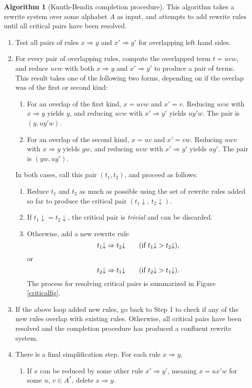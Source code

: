\documentclass[headsepline,bibliography=totoc]{scrreport}
\theoremstyle{definition}
\theoremstyle{definition}
\theoremstyle{definition}
\newtheorem{algorithm}{Algorithm}[chapter]
\begin{document}
\begin{algorithm}[Knuth-Bendix completion procedure]\label{knuthbendix} This algorithm takes a rewrite system over some alphabet $A$ as input, and attempts to add rewrite rules until all critical pairs have been resolved.
\begin{enumerate}
\item Test all pairs of rules $x\Rightarrow y$ and $x'\Rightarrow y'$ for overlapping left hand sides.
\item For every pair of overlapping rules, compute the overlapped term $t=uvw$, and reduce $uvw$ with both $x\Rightarrow y$ and $x'\Rightarrow y'$ to produce a pair of terms. This result takes one of the following two forms, depending on if the overlap was of the first or second kind:
\begin{enumerate}
\item For an overlap of the first kind, $x=uvw$ and $x'=v$. Reducing $uvw$ with $x\Rightarrow y$ yields $y$, and reducing $uvw$ with $x'\Rightarrow y'$ yields $uy'w$. The pair is $(y, uy'w)$.
\item For an overlap of the second kind, $x=uv$ and $x'=vw$. Reducing $uwv$ with $x\Rightarrow y$ yields $yw$, and reducing $uvw$ with $x'\Rightarrow y'$ yields $uy'$. The pair is $(yw, uy')$.
\end{enumerate}
In both cases, call this pair $(t_1, t_2)$, and proceed as follows:
\begin{enumerate}
\item Reduce $t_1$ and $t_2$ as much as possible using the set of rewrite rules added so far to produce the critical pair $({t}_1{\downarrow},\, {t}_2{\downarrow})$.
\item If ${t}_1{\downarrow}={t}_2{\downarrow}$, the critical pair is \emph{trivial} and can be discarded. \item Otherwise, add a new rewrite rule
\[{t}_1{\downarrow}\Rightarrow {t}_2{\downarrow}\qquad\hbox{(if ${t}_1{\downarrow}>{t}_2{\downarrow}$),}\]
or
\[{t}_2{\downarrow}\Rightarrow {t}_1{\downarrow}\qquad\hbox{(if ${t}_2{\downarrow}>{t}_1{\downarrow}$).}\]
The process for resolving critical pairs is summarized in Figure \ref{criticalfig}.
\end{enumerate}
\item If the above loop added new rules, go back to Step 1 to check if any of the new rules overlap with existing rules. Otherwise, all critical pairs have been resolved and the completion procedure has produced a confluent rewrite system.
\item There is a final simplification step. For each rule $x\Rightarrow y$,
\begin{enumerate}
\item If $x$ can be reduced by some other rule $x'\Rightarrow y'$, meaning $x=ux'w$ for some $u$, $v\in A^*$, delete $x\Rightarrow y$.


\end{enumerate}
\end{enumerate}
\end{algorithm}
\end{document}
